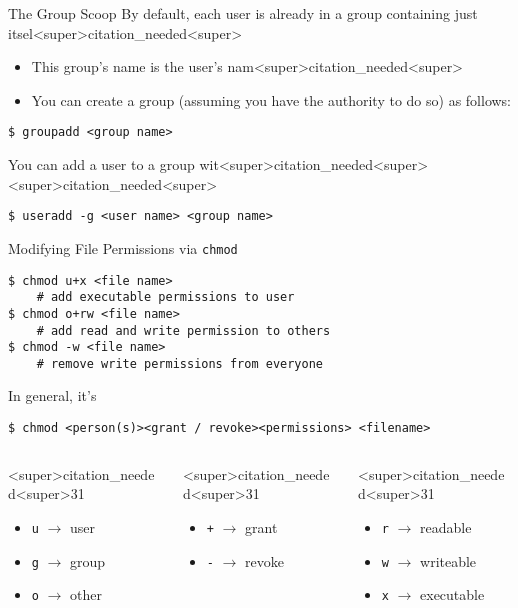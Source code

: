 \documentclass[11pt]{beamer}
\begin{document}
\begin{frame}[fragile=singleslide]{The Group Scoop}
By default, each user is already in a group containing just itsel<super>citation_needed<super>
\begin{itemize}
\item This group's name is the user's nam<super>citation_needed<super>
\item You can create a group (assuming you have the authority to do so) as follows:
\end{itemize}
\begin{lstlisting}[style=terminal]
$ groupadd <group name>
\end{lstlisting}
You can add a user to a group wit<super>citation_needed<super><super>citation_needed<super>
\begin{lstlisting}[style=terminal]
$ useradd -g <user name> <group name>
\end{lstlisting}
\end{frame}

\begin{frame}[fragile=singleslide]{Modifying File Permissions via \texttt{chmod}}
\begin{lstlisting}[style=terminal]
$ chmod u+x <file name>
    # add executable permissions to user
$ chmod o+rw <file name>
    # add read and write permission to others
$ chmod -w <file name>
    # remove write permissions from everyone
\end{lstlisting}
In general, it's 
\begin{lstlisting}[style=terminal]
$ chmod <person(s)><grant / revoke><permissions> <filename>
\end{lstlisting}
\begin{columns}
\begin{column}{<super>citation_needed<super>31\textwidth}
\begin{itemize}
\item \texttt{u} $\rightarrow$ user
\item \texttt{g} $\rightarrow$ group
\item \texttt{o} $\rightarrow$ other
\end{itemize}
\end{column}
\begin{column}{<super>citation_needed<super>31\textwidth}
\begin{itemize}
\item \texttt{+} $\rightarrow$ grant
\item \texttt{-} $\rightarrow$ revoke
\end{itemize}
\end{column}
\begin{column}{<super>citation_needed<super>31\textwidth}
\begin{itemize}
\item \texttt{r} $\rightarrow$ readable
\item \texttt{w} $\rightarrow$ writeable
\item \texttt{x} $\rightarrow$ executable
\end{itemize}
\end{column}
\end{columns}
\end{frame}
\end{document}
